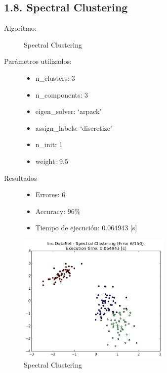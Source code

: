 \documentclass{article}
\begin{document}
\newpage




\subsection*{1.8. \; Spectral Clustering}

\begin{description}
  \item[Algoritmo:] Spectral Clustering
  \item[Parámetros utilizados:] \hfill
    \begin{itemize}
      \item n\_clusters: 3
      \item n\_components: 3
      \item eigen\_solver: ‘arpack’
      \item assign\_labels: ‘discretize’
      \item n\_init: 1
      \item weight: 9.5
    \end{itemize}
  \item[Resultados]\hfill
    \begin{itemize}
      \item Errores: 6
      \item Accuracy:  96\%
      \item Tiempo de ejecución: 0.064943 [s]
    \end{itemize}
\end{description}

\begin{figure}[H]
  \centering
  \includegraphics[width=0.666\textwidth]{img/SpectralClustering.png}
  \caption{Spectral Clustering}
\end{figure}

\newpage
\end{document}
